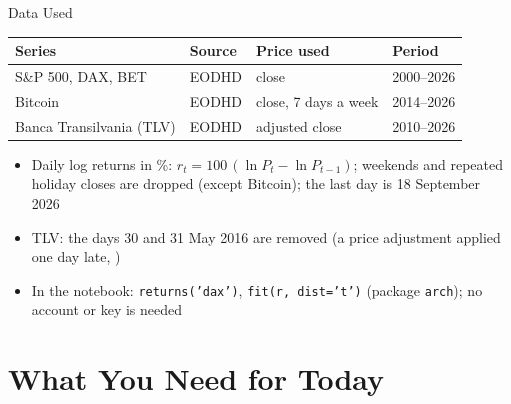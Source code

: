 \begin{frame}{Data Used}
\itemsize{\small}
\begin{center}
\footnotesize
\begin{tabular}{llll}
\toprule
\textbf{Series} & \textbf{Source} & \textbf{Price used} & \textbf{Period} \\
\midrule
S\&P 500, DAX, BET & EODHD & close & 2000--2026 \\
Bitcoin & EODHD & close, 7 days a week & 2014--2026 \\
Banca Transilvania (TLV) & EODHD & adjusted close & 2010--2026 \\
\bottomrule
\end{tabular}
\end{center}
\begin{itemize}
    \item Daily log returns in \%: $r_t = 100\,(\ln P_t - \ln P_{t-1})$; weekends and repeated holiday closes are dropped (except Bitcoin); the last day is 18 September 2026
    \item TLV: the days 30 and 31 May 2016 are removed (a price adjustment applied one day late, )
    \item In the notebook: \texttt{returns('dax')}, \texttt{fit(r, dist='t')} (package \texttt{arch}); no account or key is needed
\end{itemize}
\end{frame}


\section{What You Need for Today}

